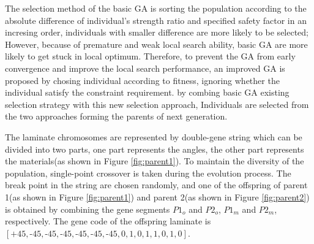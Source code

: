 \documentclass[Afour,sageh,times]{sagej}
\begin{document}
The selection method of the basic GA is sorting the population according to the absolute difference
of individual's strength ratio and specified safety factor in an incresing order, individuals with
smaller difference are more likely to be selected; However, because of premature and weak local
search ability, basic GA are more likely to get stuck in local optimum. Therefore, to prevent the GA
from early convergence and improve the local search performance, an improved GA is proposed by
chosing individual according to fitness,  ignoring whether the individual satisfy the constraint
requirement. by combing basic GA existing selection strategy with this new selection approach,
Individuals are selected from the two approaches forming the parents of next generation.


The laminate chromosomes are represented by double-gene string
which can be divided into two parts, one part represents the angles, the other
part represents the materials(as shown in Figure \ref{fig:parent1}). To maintain
the diversity of the population, single-point crossover is taken during the
evolution process. The break point in the string are chosen randomly, and one of the offspring of parent 1(as shown in Figure
\ref{fig:parent1}) and parent 2(as shown in Figure \ref{fig:parent2}) is obtained by combining the
gene segments $P1_o$ and $P2_o$, $P1_m$ and $P2_m$, respectively. The gene code of the offspring
laminate is
$[\text{+}45,\text{-}45,\text{-}45,\text{-}45,\text{-}45,\text{-}45,\text{-}45,0,1,0,1,1,0,1,0]$.
\end{document}
